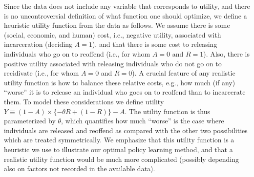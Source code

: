 \documentclass{article}
\begin{document}
Since the data does not include any variable that corresponds to utility, and there is no uncontroversial definition of what function one should optimize, we define a heuristic utility function from the data as follows. We assume there is some (social, economic, and human) cost, i.e., negative utility, associated with incarceration (deciding $A=1$), and that there is some cost to releasing individuals who go on to reoffend (i.e., for whom $A=0$ and $R=1$). Also, there is positive utility associated with releasing individuals who do not go on to recidivate (i.e., for whom $A=0$ and $R=0$). A crucial feature of any realistic utility function is how to balance these relative costs, e.g., how much (if any) ``worse'' it is to release an individual who goes on to reoffend than to incarcerate them. To model these considerations we define utility $Y \equiv (1-A) \times \{ -\theta R + (1-R) \} - A$.
The utility function is thus parameterized by $\theta$, which quantifies how much ``worse'' is the case where individuals are released and reoffend as compared with the other two possibilities which are treated symmetrically. 
We emphasize that this utility function is a heuristic we use to illustrate our optimal policy learning method, and that a realistic utility function would be much more complicated (possibly depending also on factors not recorded in the available data). %
\end{document}
